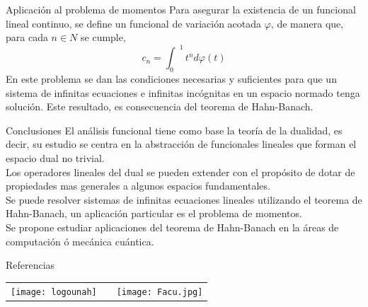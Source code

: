 \documentclass[24pt,final]{beamer}
\newlength{\onecolwid}
\begin{document}
\begin{frame}[t]
\begin{columns}[t]
\begin{column}{\onecolwid}
\begin{block}{Aplicación al problema de momentos}
Para asegurar la existencia de un funcional lineal continuo, se define un funcional  de variación acotada $\varphi$, de manera que, para cada $n \in N$ se cumple,
\[  c_n =  {\int_0}^1 t^n d\varphi(t) \] En este problema se dan las condiciones necesarias y suficientes para que un sistema de infinitas ecuaciones e infinitas incógnitas en un espacio normado tenga solución. Este resultado, es consecuencia del teorema de Hahn-Banach.\\
\end{block}


\begin{block}{Conclusiones}
El análisis funcional tiene como base la teoría de la dualidad, es decir, su estudio se centra en la abstracción de funcionales lineales que forman el espacio dual no trivial.\\[0.5cm]

Los operadores lineales del dual se pueden extender con el propósito de dotar de propiedades mas generales a algunos espacios fundamentales.\\[0.5cm]

Se puede resolver sistemas de infinitas ecuaciones lineales utilizando el teorema de Hahn-Banach, un aplicación particular es el problema de momentos.\\[0.5cm]

Se propone estudiar aplicaciones del teorema de Hahn-Banach en la áreas de computación ó mecánica cuántica.


\end{block}


\begin{block}{Referencias}

\nocite{*} %
\small{
\vspace{0.75in}}

\end{block}
\begin{center}
\begin{tabular}{ccc}
\texttt{[image: logounah]} & \hfill \hspace{3cm} & \texttt{[image: Facu.jpg]}
\end{tabular}
\end{center}

\end{column} %

\end{columns} %

\end{frame} %
\end{document}
